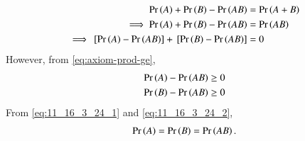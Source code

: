 \begin{align}
\pr{A}+\pr{B}-\pr{AB}&=\pr{A+B}\\
\implies \pr{A}+\pr{B}-\pr{AB}&=\pr{AB}\\
\implies\sbrak{\pr{A}-\pr{AB}}+\sbrak{\pr{B}-\pr{AB}}&= 0
\label{eq:11_16_3_24_1}
\end{align}
However, from 
	\eqref{eq:axiom-prod-ge},
\begin{align}
	\begin{split}
	\pr{A}-\pr{AB} &\ge 0\\
	\pr{B}-\pr{AB} &\ge 0
	\end{split}
\label{eq:11_16_3_24_2}
\end{align}
From \eqref{eq:11_16_3_24_1} and \eqref{eq:11_16_3_24_2}, 
\begin{align}
	\Pr\left(A\right) =\Pr\left(B\right) =\Pr\left(AB\right).
\end{align}
